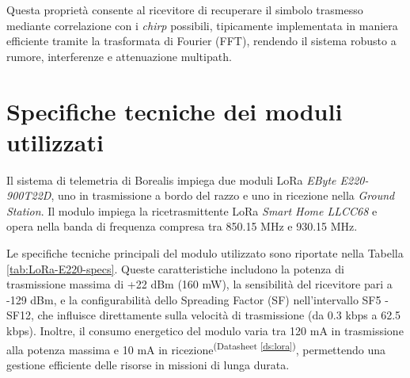 \documentclass[12pt,a4paper,twoside]{book}
\newcommand{\dsref}[1]{\textsuperscript{(Datasheet \ref{#1})}}
\begin{document}
Questa proprietà consente al ricevitore di recuperare il simbolo trasmesso mediante
correlazione con i \emph{chirp} possibili, tipicamente implementata in maniera efficiente
tramite la trasformata di Fourier (FFT), rendendo il sistema robusto a rumore,
interferenze e attenuazione multipath\cite{10609524}.

\section{Specifiche tecniche dei moduli utilizzati}

Il sistema di telemetria di Borealis impiega due moduli \ac{LoRa}
\emph{EByte E220-900T22D}, uno in trasmissione a bordo del razzo e uno in
ricezione nella \emph{Ground Station}.
Il modulo impiega la ricetrasmittente \ac{LoRa} \emph{Smart Home LLCC68} e
opera nella banda di frequenza compresa tra 850.15 MHz e 930.15 MHz.

Le specifiche tecniche principali del modulo utilizzato sono riportate nella
Tabella \ref{tab:LoRa-E220-specs}. Queste caratteristiche includono la potenza di
trasmissione massima di +22 dBm (160 mW), la sensibilità del ricevitore pari a
-129 dBm, e la configurabilità dello Spreading Factor (SF) nell'intervallo
SF5 - SF12, che influisce direttamente sulla velocità di trasmissione (da 0.3 kbps
a 62.5 kbps). Inoltre, il consumo energetico del modulo varia tra 120 mA in
trasmissione alla potenza massima e 10 mA in ricezione\dsref{ds:lora}, permettendo una gestione
efficiente delle risorse in missioni di lunga durata.
\end{document}
